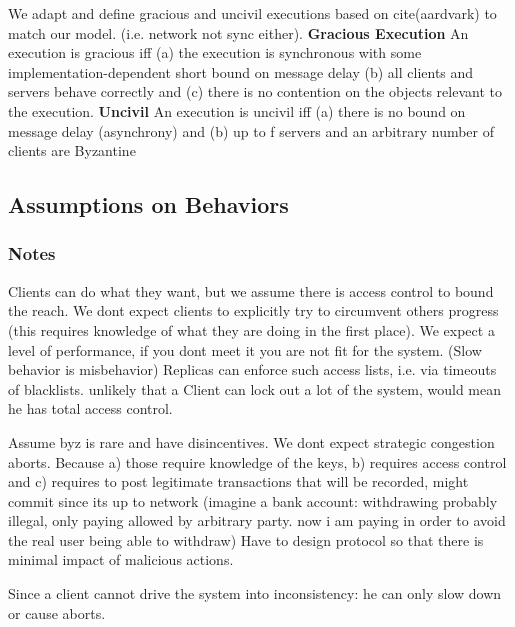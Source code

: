 We adapt and define gracious and uncivil executions based on cite(aardvark) to match our model. (i.e. network not sync either).
\textbf{Gracious Execution}
An execution is gracious iff (a) the execution is synchronous with some
implementation-dependent short bound on message delay (b) all clients and servers behave correctly and (c) there is no contention on the objects relevant to the execution.
\textbf{Uncivil}
An execution is uncivil iff (a) there is no bound on message delay (asynchrony) and (b) up to f servers and an arbitrary number of clients are Byzantine 


\subsection{Assumptions on Behaviors}
\subsubsection{Notes}
Clients can do what they want, but we assume there is access control to bound the reach. We dont expect clients to explicitly try to circumvent others progress (this requires knowledge of what they are doing in the first place).
We expect a level of performance, if you dont meet it you are not fit for the system. (Slow behavior is misbehavior)
Replicas can enforce such access lists, i.e. via timeouts of blacklists.
unlikely that a Client can lock out a lot of the system, would mean he has total access control.

Assume byz is rare and have disincentives. We dont expect strategic congestion aborts. Because a) those require knowledge of the keys, b) requires access control and c) requires to post legitimate transactions that will be recorded, might commit since its up to network (imagine a bank account: withdrawing probably illegal, only paying allowed by arbitrary party. now i am paying in order to avoid the real user being able to withdraw)
Have to design protocol so that there is minimal impact of malicious actions.

Since a client cannot drive the system into inconsistency: he can only slow down or cause aborts.
